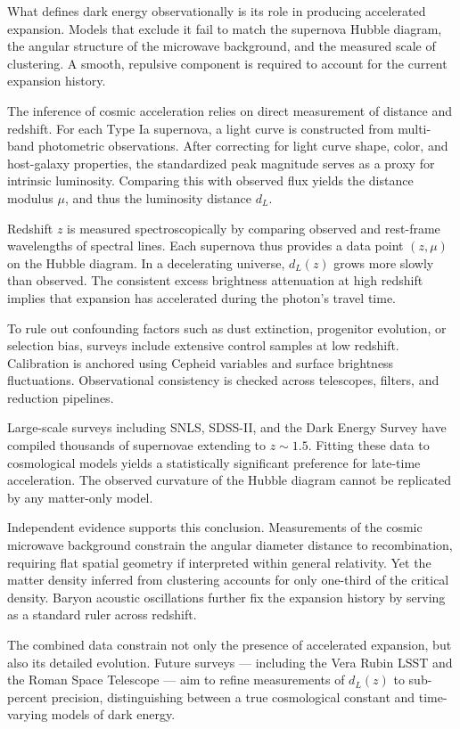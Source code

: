 What defines dark energy observationally is its role in producing accelerated expansion. Models that exclude it fail to match the supernova Hubble diagram, the angular structure of the microwave background, and the measured scale of clustering. A smooth, repulsive component is required to account for the current expansion history.

The inference of cosmic acceleration relies on direct measurement of distance and redshift. For each Type Ia supernova, a light curve is constructed from multi-band photometric observations. After correcting for light curve shape, color, and host-galaxy properties, the standardized peak magnitude serves as a proxy for intrinsic luminosity. Comparing this with observed flux yields the distance modulus $\mu$, and thus the luminosity distance $d_L$.

Redshift $z$ is measured spectroscopically by comparing observed and rest-frame wavelengths of spectral lines. Each supernova thus provides a data point $(z, \mu)$ on the Hubble diagram. In a decelerating universe, $d_L(z)$ grows more slowly than observed. The consistent excess brightness attenuation at high redshift implies that expansion has accelerated during the photon’s travel time.

To rule out confounding factors such as dust extinction, progenitor evolution, or selection bias, surveys include extensive control samples at low redshift. Calibration is anchored using Cepheid variables and surface brightness fluctuations. Observational consistency is checked across telescopes, filters, and reduction pipelines.

Large-scale surveys including SNLS, SDSS-II, and the Dark Energy Survey have compiled thousands of supernovae extending to $z \sim 1.5$. Fitting these data to cosmological models yields a statistically significant preference for late-time acceleration. The observed curvature of the Hubble diagram cannot be replicated by any matter-only model.

Independent evidence supports this conclusion. Measurements of the cosmic microwave background constrain the angular diameter distance to recombination, requiring flat spatial geometry if interpreted within general relativity. Yet the matter density inferred from clustering accounts for only one-third of the critical density. Baryon acoustic oscillations further fix the expansion history by serving as a standard ruler across redshift.

The combined data constrain not only the presence of accelerated expansion, but also its detailed evolution. Future surveys — including the Vera Rubin LSST and the Roman Space Telescope — aim to refine measurements of $d_L(z)$ to sub-percent precision, distinguishing between a true cosmological constant and time-varying models of dark energy.


